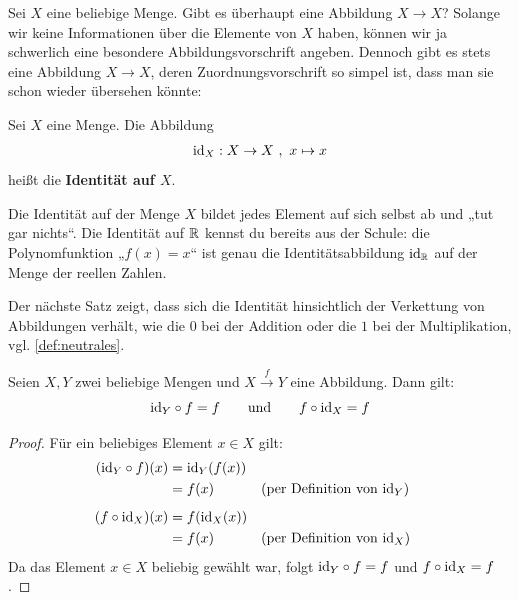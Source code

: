 Sei $X$ eine beliebige Menge. Gibt es überhaupt eine Abbildung $X\to X$? Solange wir keine Informationen über die Elemente von $X$ haben, können wir ja schwerlich eine besondere Abbildungsvorschrift angeben. Dennoch gibt es stets eine Abbildung $X\to X$, deren Zuordnungsvorschrift so simpel ist, dass man sie schon wieder übersehen könnte:


\begin{defin}[Identitätsabbildung] 
    Sei $X$ eine Menge. Die Abbildung
    \begin{align*}
        \mathrm{id}_X: X \to X \ ,\ x \mapsto x
    \end{align*}
    heißt die \textbf{Identität auf $X$}.
\end{defin}


\begin{bem}
    Die Identität auf der Menge $X$ bildet jedes Element auf sich selbst ab und „tut gar nichts“. Die Identität auf $\mathbb R$ kennst du bereits aus der Schule: die Polynomfunktion „$f(x)=x$“ ist genau die Identitätsabbildung $\mathrm{id}_\mathbb R$ auf der Menge der reellen Zahlen.
\end{bem}


\noindent Der nächste Satz zeigt, dass sich die Identität hinsichtlich der Verkettung von Abbildungen verhält, wie die $0$ bei der Addition oder die $1$ bei der Multiplikation, vgl. \cref{def:neutrales}.


\begin{satz} \label{idneutral}
    Seien $X,Y$ zwei beliebige Mengen und $X\xrightarrow{f} Y$ eine Abbildung. Dann gilt:
        \[ \mathrm{id}_Y \circ f = f \qquad\textnormal{und}\qquad f\circ \mathrm{id}_X = f \]
\end{satz}
\begin{proof}
    Für ein beliebiges Element $x \in X$ gilt:
    \begin{align*}
        (\mathrm{id}_Y \circ f)(x) & =\mathrm{id}_Y(f(x)) \\
        & = f(x)&& (\text{per Definition von $\mathrm{id}_Y$}) \\[0.5em]
        (f\circ \mathrm{id}_X)(x) & = f(\mathrm{id}_X(x)) \\
        & =f(x) && (\text{per Definition von $\mathrm{id}_X$})
    \end{align*}
    Da das Element $x\in X$ beliebig gewählt war, folgt $\mathrm{id}_Y\circ f=f$ und $f\circ \mathrm{id}_X=f$.
\end{proof}



